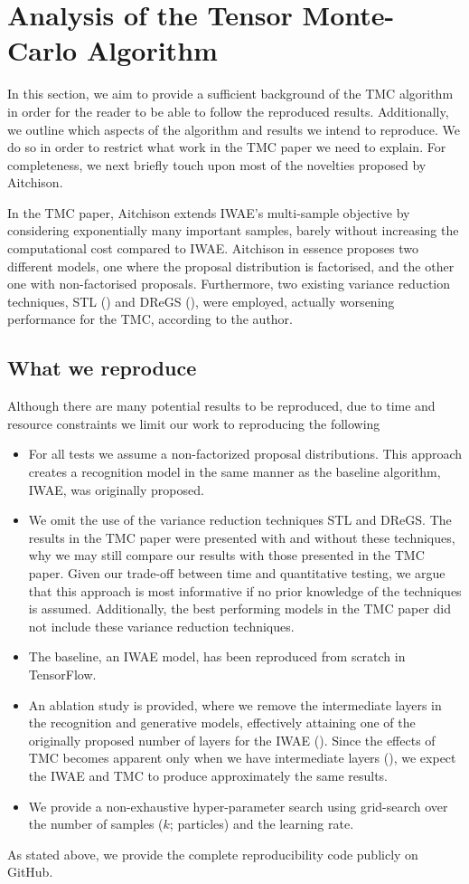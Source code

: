 \documentclass{article}
\begin{document}
\section{Analysis of the Tensor Monte-Carlo Algorithm}
In this section, we aim to provide a sufficient background of the TMC algorithm in order for the reader to be able to follow the reproduced results. Additionally, we outline which aspects of the algorithm and results we intend to reproduce.
We do so in order to restrict what work in the TMC paper we need to explain.
 For completeness, we next briefly touch upon most of the novelties proposed by Aitchison.

In the TMC paper, Aitchison extends IWAE's multi-sample objective by considering exponentially many important samples, barely without increasing the computational cost compared to IWAE. Aitchison in essence proposes two different models, one where the proposal distribution is factorised, and the other one with non-factorised proposals. Furthermore, two existing variance reduction techniques, STL (\cite{roeder2017sticking}) and DReGS (\cite{tucker2018doubly}), were employed, actually worsening performance for the TMC, according to the author. 

\subsection{What we reproduce}
Although there are many potential results to be reproduced, due to time and resource constraints we limit our work to reproducing the following
\begin{itemize}
    \item For all tests we assume a non-factorized proposal distributions. This approach creates a recognition model in the same manner as the baseline algorithm, IWAE, was originally proposed.
    \item We omit the use of the variance reduction techniques STL and DReGS. The results in the TMC paper were presented with and without these techniques, why we may still compare our results with those presented in the TMC paper. Given our trade-off between time and quantitative testing, we argue that this approach is most informative if no prior knowledge of the techniques is assumed. Additionally, the best performing models in the TMC paper did not include these variance reduction techniques.
    \item The baseline, an IWAE model, has been reproduced from scratch in TensorFlow.
    \item An ablation study is provided, where we remove the intermediate layers in the recognition and generative models, effectively attaining one of the originally proposed number of layers for the IWAE (\cite{iwae}). Since the effects of TMC becomes apparent only when we have intermediate layers (\cite{tmc}), we expect the IWAE and TMC to produce approximately the same results.
    \item We provide a non-exhaustive hyper-parameter search using grid-search over the number of samples ($k$; particles) and the learning rate.
\end{itemize}
As stated above, we provide the complete reproducibility code publicly on GitHub. 
\end{document}
